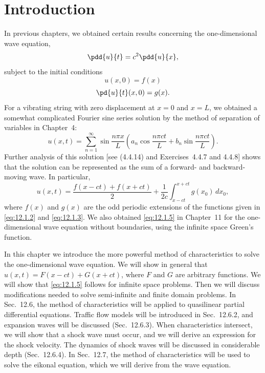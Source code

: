 \section{Introduction}
\label{sec:char-intro}

In previous chapters, we obtained certain results concerning the one-dimensional wave equation,
\begin{equation}
\label{eq:12.1.1}
\pdd{u}{t} = c^2 \pdd{u}{x},
\end{equation}
subject to the initial conditions
\begin{equation}
\label{eq:12.1.2}
u(x,0) = f(x)
\end{equation}
\begin{equation}
\label{eq:12.1.3}
\pd{u}{t}(x,0) = g(x).
\end{equation}
For a vibrating string with zero displacement at $x = 0$ and $x = L$, we obtained a somewhat complicated Fourier sine series solution by the method of separation of variables in Chapter~4:
\begin{equation}
\label{eq:12.1.4}
u(x,t) = \sum_{n=1}^{\infty} \sin\frac{n\pi x}{L} \left(a_n \cos\frac{n\pi ct}{L} + b_n \sin\frac{n\pi ct}{L}\right).
\end{equation}
Further analysis of this solution [see (4.4.14) and Exercises~4.4.7 and 4.4.8] shows that the solution can be represented as the sum of a forward- and backward-moving wave.  In particular,
\begin{equation}
\label{eq:12.1.5}
u(x,t) = \frac{f(x-ct) + f(x+ct)}{2} + \frac{1}{2c}\int_{x-ct}^{x+ct} g(x_0)\,dx_0,
\end{equation}
where $f(x)$ and $g(x)$ are the odd periodic extensions of the functions given in \eqref{eq:12.1.2} and \eqref{eq:12.1.3}.  We also obtained \eqref{eq:12.1.5} in Chapter~11 for the one-dimensional wave equation without boundaries, using the infinite space Green's function.

In this chapter we introduce the more powerful method of characteristics to solve the one-dimensional wave equation.  We will show in general that $u(x,t) = F(x-ct) + G(x+ct)$, where $F$ and $G$ are arbitrary functions.  We will show that \eqref{eq:12.1.5} follows for infinite space problems.  Then we will discuss modifications needed to solve semi-infinite and finite domain problems.  In Sec.~12.6, the method of characteristics will be applied to quasilinear partial differential equations.  Traffic flow models will be introduced in Sec.~12.6.2, and expansion waves will be discussed (Sec.~12.6.3).  When characteristics intersect, we will show that a shock wave must occur, and we will derive an expression for the shock velocity.  The dynamics of shock waves will be discussed in considerable depth (Sec.~12.6.4).  In Sec.~12.7, the method of characteristics will be used to solve the eikonal equation, which we will derive from the wave equation.
